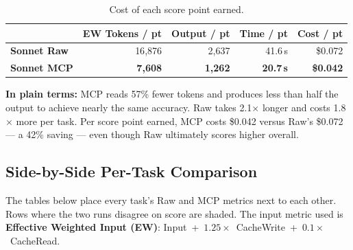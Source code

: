\begin{table}[h]
\centering
\caption{Cost of each score point earned.}\label{tab:efficiency-sonnet}
\begin{tabular}{lrrrr}
\toprule
& \textbf{EW Tokens / pt} & \textbf{Output / pt} & \textbf{Time / pt} & \textbf{Cost / pt} \\
\midrule
\textbf{Sonnet Raw} & 16{,}876 & 2{,}637 & 41.6\,s & \$0.072 \\
\textbf{Sonnet MCP} & \textbf{7{,}608} & \textbf{1{,}262} & \textbf{20.7\,s} & \textbf{\$0.042} \\
\bottomrule
\end{tabular}
\end{table}

\noindent
\textbf{In plain terms:} MCP reads 57\% fewer tokens and produces
less than half the output to achieve nearly the same accuracy.
Raw takes 2.1$\times$ longer and costs 1.8$\times$ more per task.
Per score point earned, MCP costs \$0.042 versus Raw's \$0.072 ---
a 42\% saving --- even though Raw ultimately scores higher overall.

\subsection{Side-by-Side Per-Task Comparison}\label{sec:side-by-side-sonnet}

The tables below place every task's Raw and MCP metrics next to each
other.  Rows where the two runs disagree on score are shaded.
The input metric used is \textbf{Effective Weighted Input (EW)}:
Input~+~$1.25 \times$~CacheWrite~+~$0.1 \times$~CacheRead.

